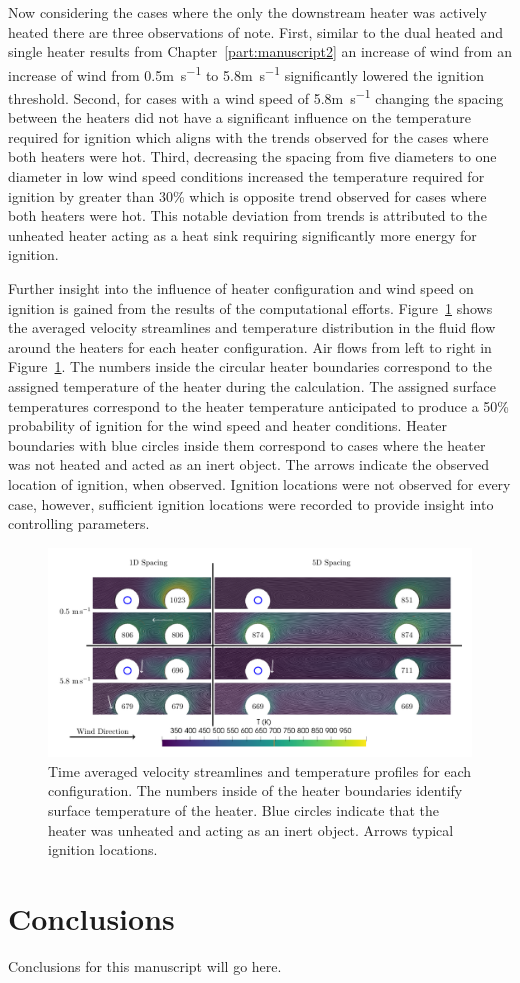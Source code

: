     Now considering the cases where the only the downstream heater was actively heated there are three observations of note. First, similar to the dual heated and single heater results from Chapter~\ref{part:manuscript2} an increase of wind from an increase of wind from 0.5\si{\meter\per\second} to 5.8\si{\meter\per\second} significantly lowered the ignition threshold. Second, for cases with a wind speed of 5.8\si{\meter\per\second} changing the spacing between the heaters did not have a significant influence on the temperature required for ignition which aligns with the trends observed for the cases where both heaters were hot. Third, decreasing the spacing from five diameters to one diameter in low wind speed conditions increased the temperature required for ignition by greater than 30\% which is opposite trend observed for cases where both heaters were hot. This notable deviation from trends is attributed to the unheated heater acting as a heat sink requiring significantly more energy for ignition. 
    
    Further insight into the influence of heater configuration and wind speed on ignition is gained from the results of the computational efforts. Figure~\ref{fig:multiHeaterCFD} shows the averaged velocity streamlines and temperature distribution in the fluid flow around the heaters for each heater configuration. Air flows from left to right in Figure~\ref{fig:multiHeaterCFD}. The numbers inside the circular heater boundaries correspond to the assigned temperature of the heater during the calculation. The assigned surface temperatures correspond to the heater temperature anticipated to produce a 50\% probability of ignition for the wind speed and heater conditions. Heater boundaries with blue circles inside them correspond to cases where the heater was not heated and acted as an inert object. The arrows indicate the observed location of ignition, when observed. Ignition locations were not observed for every case, however, sufficient ignition locations were recorded to provide insight into controlling parameters.
        \begin{figure}
            \centering
            \includegraphics[width=\columnwidth]{Figures/quarter_circle.pdf}
            \caption{Time averaged velocity streamlines and temperature profiles for each configuration. The numbers inside of the heater boundaries identify surface temperature of the heater. Blue circles indicate that the heater was unheated and acting as an inert object. Arrows typical ignition locations.}
            \label{fig:multiHeaterCFD}
        \end{figure}
    
\section{Conclusions}
    Conclusions for this manuscript will go here. 